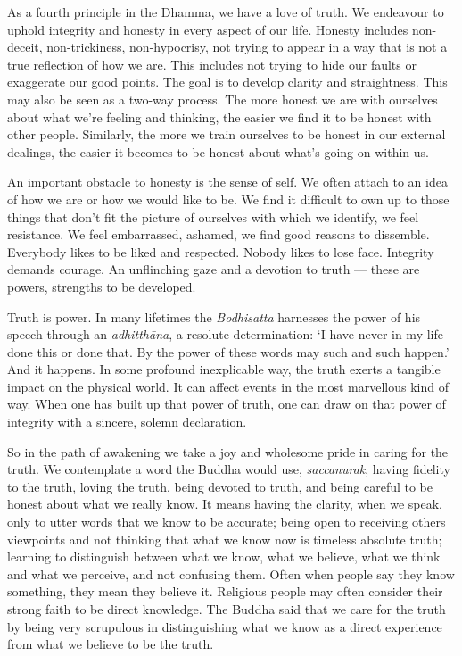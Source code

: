 As a fourth principle in the Dhamma, we have a love of truth. We
endeavour to uphold integrity and honesty in every aspect of our life.
Honesty includes non-deceit, non-trickiness, non-hypocrisy, not trying
to appear in a way that is not a true reflection of how we are. This
includes not trying to hide our faults or exaggerate our good points.
The goal is to develop clarity and straightness. This may also be seen
as a two-way process. The more honest we are with ourselves about what
we're feeling and thinking, the easier we find it to be honest with
other people. Similarly, the more we train ourselves to be honest in our
external dealings, the easier it becomes to be honest about what's going
on within us.

An important obstacle to honesty is the sense of self. We often attach
to an idea of how we are or how we would like to be. We find it
difficult to own up to those things that don't fit the picture of
ourselves with which we identify, we feel resistance. We feel
embarrassed, ashamed, we find good reasons to dissemble. Everybody likes
to be liked and respected. Nobody likes to lose face. Integrity demands
courage. An unflinching gaze and a devotion to truth --- these are
powers, strengths to be developed.

Truth is power. In many lifetimes the \emph{Bodhisatta} harnesses the
power of his speech through an \emph{adhitthāna}, a resolute
determination: `I have never in my life done this or done that. By the
power of these words may such and such happen.' And it happens. In some
profound inexplicable way, the truth exerts a tangible impact on the
physical world. It can affect events in the most marvellous kind of way.
When one has built up that power of truth, one can draw on that power of
integrity with a sincere, solemn declaration.

So in the path of awakening we take a joy and wholesome pride in caring
for the truth. We contemplate a word the Buddha would use,
\emph{saccanurak}, having fidelity to the truth, loving the truth, being
devoted to truth, and being careful to be honest about what we really
know. It means having the clarity, when we speak, only to utter words
that we know to be accurate; being open to receiving others viewpoints
and not thinking that what we know now is timeless absolute truth;
learning to distinguish between what we know, what we believe, what we
think and what we perceive, and not confusing them. Often when people
say they know something, they mean they believe it. Religious people may
often consider their strong faith to be direct knowledge. The Buddha
said that we care for the truth by being very scrupulous in
distinguishing what we know as a direct experience from what we believe
to be the truth.

